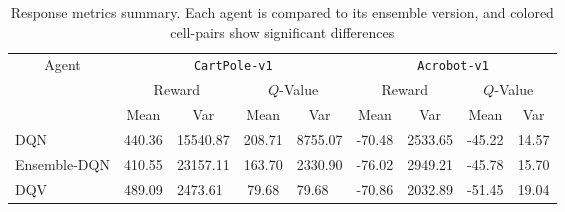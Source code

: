 \begin{table*}
\centering
\setlength{\extrarowheight}{0pt}
\addtolength{\extrarowheight}{\aboverulesep}
\addtolength{\extrarowheight}{\belowrulesep}
\setlength{\aboverulesep}{0pt}
\setlength{\belowrulesep}{0pt}
\caption{Response metrics summary. Each agent is compared to its
  ensemble version, and colored cell-pairs show significant
  differences}\label{table:center_results}
\begin{tabular}{lclclclcl}
\toprule
\multicolumn{1}{c}{\multirow{3}{*}{Agent}} & \multicolumn{4}{c}{\texttt{CartPole-v1}}                                                                                                                                  & \multicolumn{4}{c}{\texttt{Acrobot-v1}}                                                                      \\
\cline{2-9}
\multicolumn{1}{c}{}                       & \multicolumn{2}{c}{Reward}                                                          & \multicolumn{2}{c}{$Q$-Value}                                                       & \multicolumn{2}{c}{Reward}                           & \multicolumn{2}{c}{$Q$-Value}                         \\
\cline{2-9}
\multicolumn{1}{c}{}                       & Mean                                                      & \multicolumn{1}{c}{Var} & Mean                                                      & \multicolumn{1}{c}{Var} & Mean                       & \multicolumn{1}{c}{Var} & Mean                       & \multicolumn{1}{c}{Var}  \\
\hline
DQN                                        & {\cellcolor[rgb]{1,0.988,0.62}}440.36                     & 15540.87                & {\cellcolor[rgb]{1,0.988,0.62}}208.71                     & 8755.07                 & -70.48                     & 2533.65                 & -45.22                     & 14.57                    \\
Ensemble-DQN                               & \multicolumn{1}{l}{{\cellcolor[rgb]{1,0.988,0.62}}410.55} & 23157.11                & \multicolumn{1}{l}{{\cellcolor[rgb]{1,0.988,0.62}}163.70} & 2330.90                 & \multicolumn{1}{l}{-76.02} & 2949.21                 & \multicolumn{1}{l}{-45.78} & 15.70                    \\
DQV                                        & {\cellcolor[rgb]{1,0.988,0.62}}489.09                     & 2473.61                 & 79.68                                                     & 79.68                   & -70.86                     & 2032.89                 & -51.45                     & 19.04                    \\

\end{tabular}
\end{table*}
